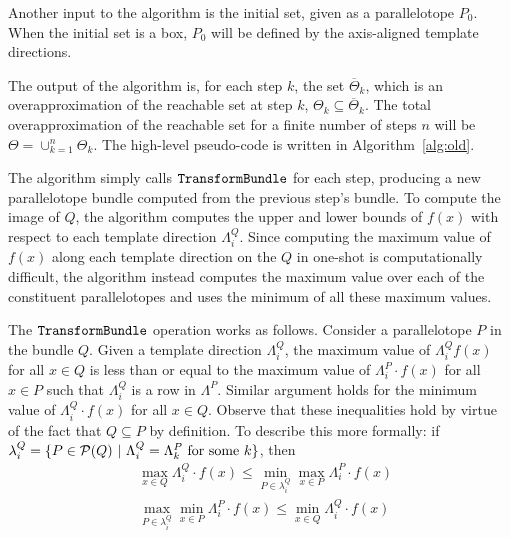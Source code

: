 Another input to the algorithm is the initial set, given as a parallelotope $P_0$. When the initial set is a box, $P_0$ will be defined by the axis-aligned template directions.

The output of the algorithm is, for each step $k$, the set $\overline\Theta_k$, which is an overapproximation of the reachable set at step $k$, $\Theta_k \subseteq \overline\Theta_k$. The total overapproximation of the reachable set for a finite number of steps $n$ will be $\Theta = \cup_{k=1}^n \Theta_k$.
%
The high-level pseudo-code is written in Algorithm~\ref{alg:old}.

The algorithm simply calls $\texttt{TransformBundle}$ for each step, producing a new parallelotope bundle computed from the previous step's bundle.
%
To compute the image of $Q$, the algorithm computes the upper and lower bounds of $f(x)$ with respect to each template direction $\Lambda_i^Q$.
%
Since computing the maximum value of $f(x)$ along each template direction on the $Q$ in one-shot is computationally difficult, the algorithm instead computes the maximum value over each of the constituent parallelotopes and uses the minimum of all these maximum values.

The $\texttt{TransformBundle}$  operation works as follows.
%
Consider a parallelotope $P$ in the bundle $Q$.
%
Given a template direction $\Lambda_i^Q$, the maximum value of $\Lambda_{i}^Q f(x)$ for all $x \in Q$ is less than or equal to the maximum value of $\Lambda_{i}^P \cdot f(x)$ for all $x \in P$ such that $\Lambda_i^Q$ is a row in $\Lambda^P$.
%
Similar argument holds for the minimum value of $\Lambda_{i}^Q \cdot f(x)$ for all $x \in Q$.
%
Observe that these inequalities hold by virtue of the fact that $Q \subseteq P$ by definition.
%
To describe this more formally: if $\lambda^Q_i = \{ P \in \mathcal{P}(Q) ~|~ \Lambda_i^Q = \Lambda_k^P \text{ for some } k \}$, then
%
\begin{align}
    & \max_{x \in Q}{\Lambda_{i}^Q \cdot f(x)} \leq \min_{P \in \lambda^Q_i} {\max_{x \in P}{\Lambda_{i}^P \cdot f(x)}}  \label{eq:max_over_ptopes}
 \\
    & \max_{P \in \lambda^Q_i} {\min_{x \in P}{\Lambda_{i}^P \cdot f(x)}} \leq \min_{x \in Q}{\Lambda_{i}^Q \cdot f(x)} \label{eq:min_over_ptopes}
\end{align}

